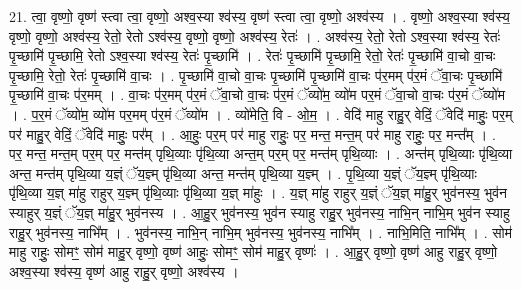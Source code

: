\documentclass[17pt]{extarticle}
\begin{document}
21. त्वा॒ वृष्णो॒ वृष्ण॑ स्त्वा त्वा॒ वृष्णो॒ अश्व॒स्या श्व॑स्य॒ वृष्ण॑ स्त्वा त्वा॒ वृष्णो॒ अश्व॑स्य । . वृष्णो॒ अश्व॒स्या श्व॑स्य॒ वृष्णो॒ वृष्णो॒ अश्व॑स्य॒ रेतो॒ रेतो ऽश्व॑स्य॒ वृष्णो॒ वृष्णो॒ अश्व॑स्य॒ रेतः॑ । . अश्व॑स्य॒ रेतो॒ रेतो ऽश्व॒स्या श्व॑स्य॒ रेतः॑ पृ॒च्छामि॑ पृ॒च्छामि॒ रेतो ऽश्व॒स्या श्व॑स्य॒ रेतः॑ पृ॒च्छामि॑ । . रेतः॑ पृ॒च्छामि॑ पृ॒च्छामि॒ रेतो॒ रेतः॑ पृ॒च्छामि॑ वा॒चो वा॒चः पृ॒च्छामि॒ रेतो॒ रेतः॑ पृ॒च्छामि॑ वा॒चः । . पृ॒च्छामि॑ वा॒चो वा॒चः पृ॒च्छामि॑ पृ॒च्छामि॑ वा॒चः प॑र॒मम् प॑र॒मं ॅवा॒चः पृ॒च्छामि॑ पृ॒च्छामि॑ वा॒चः प॑र॒मम् । . वा॒चः प॑र॒मम् प॑र॒मं ॅवा॒चो वा॒चः प॑र॒मं ॅव्यो॑म॒ व्यो॑म पर॒मं ॅवा॒चो वा॒चः प॑र॒मं ॅव्यो॑म । . प॒र॒मं ॅव्यो॑म॒ व्यो॑म पर॒मम् प॑र॒मं ॅव्यो॑म । . व्यो॑मेति॒ वि - ओ॒म॒ । . वेदि॑ माहु राहु॒र् वेदिं॒ ॅवेदि॑ माहुः॒ पर॒म् पर॑ माहु॒र् वेदिं॒ ॅवेदि॑ माहुः॒ पर᳚म् । . आ॒हुः॒ पर॒म् पर॑ माहु राहुः॒ पर॒ मन्त॒ मन्त॒म् पर॑ माहु राहुः॒ पर॒ मन्त᳚म् । . पर॒ मन्त॒ मन्त॒म् पर॒म् पर॒ मन्त॑म् पृथि॒व्याः पृ॑थि॒व्या अन्त॒म् पर॒म् पर॒ मन्त॑म् पृथि॒व्याः । . अन्त॑म् पृथि॒व्याः पृ॑थि॒व्या अन्त॒ मन्त॑म् पृथि॒व्या य॒ज्ञ्ं ॅय॒ज्ञ्म् पृ॑थि॒व्या अन्त॒ मन्त॑म् पृथि॒व्या य॒ज्ञ्म् । . पृ॒थि॒व्या य॒ज्ञ्ं ॅय॒ज्ञ्म् पृ॑थि॒व्याः पृ॑थि॒व्या य॒ज्ञ् मा॑हु राहुर् य॒ज्ञ्म् पृ॑थि॒व्याः पृ॑थि॒व्या य॒ज्ञ् मा॑हुः । . य॒ज्ञ् मा॑हु राहुर् य॒ज्ञ्ं ॅय॒ज्ञ् मा॑हु॒र् भुव॑नस्य॒ भुव॑न स्याहुर् य॒ज्ञ्ं ॅय॒ज्ञ् मा॑हु॒र् भुव॑नस्य । . आ॒हु॒र् भुव॑नस्य॒ भुव॑न स्याहु राहु॒र् भुव॑नस्य॒ नाभि॒न् नाभि॒म् भुव॑न स्याहु राहु॒र् भुव॑नस्य॒ नाभि᳚म् । . भुव॑नस्य॒ नाभि॒न् नाभि॒म् भुव॑नस्य॒ भुव॑नस्य॒ नाभि᳚म् । . नाभि॒मिति॒ नाभि᳚म् । . सोम॑ माहु राहुः॒ सोमꣳ॒॒ सोम॑ माहु॒र् वृष्णो॒ वृष्ण॑ आहुः॒ सोमꣳ॒॒ सोम॑ माहु॒र् वृष्णः॑ । . आ॒हु॒र् वृष्णो॒ वृष्ण॑ आहु राहु॒र् वृष्णो॒ अश्व॒स्या श्व॑स्य॒ वृष्ण॑ आहु राहु॒र् वृष्णो॒ अश्व॑स्य । \newline
\end{document}
